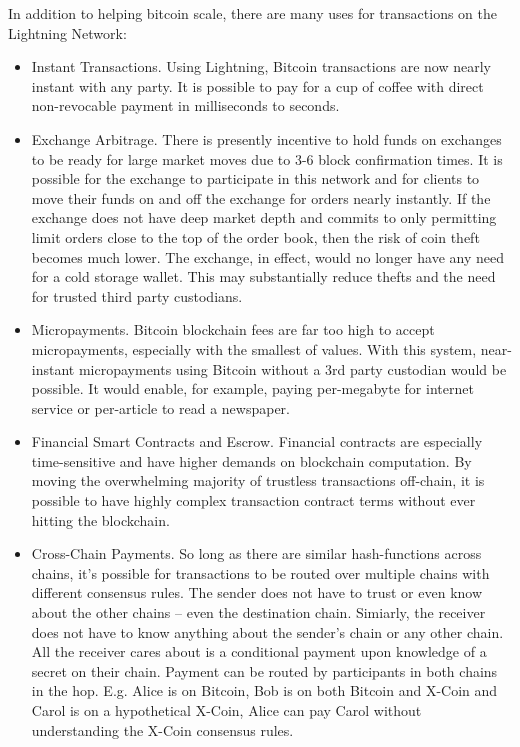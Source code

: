 \documentclass[letterpaper,11pt]{article}
\begin{document}
In addition to helping bitcoin scale, there are many uses for transactions on
the Lightning Network:
\begin{itemize}
	\item Instant Transactions. Using Lightning, Bitcoin transactions are now nearly instant
		with any party. It is possible to pay for a cup of coffee with
		direct non-revocable payment in milliseconds to seconds.
	
	\item Exchange Arbitrage. There is presently incentive to hold funds on
		exchanges to be ready for large market moves due to 3-6 block
		confirmation times. It is possible for the exchange to
		participate in this network and for clients to move their funds
		on and off the exchange for orders nearly instantly. If the
		exchange does not have deep market depth and commits to only
		permitting limit orders close to the top of the order book, then
		the risk of coin theft becomes much lower. The exchange, in
		effect, would no longer have any need for a cold storage wallet.
		This may substantially reduce thefts and the need for trusted
		third party custodians.

	\item Micropayments. Bitcoin blockchain fees are far too high to accept
		micropayments, especially with the smallest of values. With this
		system, near-instant micropayments using Bitcoin without a 3rd
		party custodian would be possible. It would enable, for example,
		paying per-megabyte for internet service or per-article to read
		a newspaper.
	
	\item Financial Smart Contracts and Escrow. Financial contracts are
		especially time-sensitive and have higher demands on blockchain
		computation. By moving the overwhelming majority of trustless
		transactions off-chain, it is possible to have highly complex
		transaction contract terms without ever hitting the blockchain.

	\item Cross-Chain Payments. So long as there are similar hash-functions
		across chains, it's possible for transactions to be routed over
		multiple chains with different consensus rules. The sender does
		not have to trust or even know about the other chains -- even
		the destination chain. Simiarly, the receiver does not have to
		know anything about the sender's chain or any other chain. All
		the receiver cares about is a conditional payment upon
		knowledge of a secret on their chain. Payment can be routed by
		participants in both chains in the hop. E.g. Alice is on
		Bitcoin, Bob is on both Bitcoin and X-Coin and Carol is on
		a hypothetical X-Coin, Alice can pay Carol without
		understanding the X-Coin consensus rules.

\end{itemize}
\end{document}
